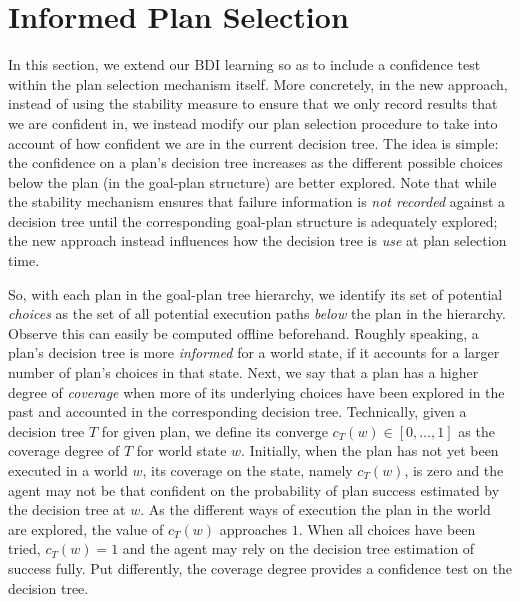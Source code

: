 \section{Informed Plan Selection}\label{sec:coverage}

In this section, we extend our BDI learning so as to include a confidence test
within the plan selection mechanism itself. More concretely, in the new approach,
instead of using the stability measure to ensure that we only record results that
we are confident in, we instead modify our plan selection procedure to take into
account of how confident we are in the current decision tree.
The idea is simple: the confidence on a plan's decision tree increases as the
different possible choices below the plan (in the goal-plan structure) are better
explored.
Note that while the stability mechanism ensures that failure information is
\emph{not recorded} against a decision tree until the corresponding goal-plan
structure is adequately explored; the new approach instead influences how the
decision tree is \emph{use} at plan selection time.


So, with each plan in the goal-plan tree hierarchy, we identify its set of
potential \textit{choices} as the set of all potential execution paths
\textit{below} the plan in the hierarchy. Observe this can easily be computed
offline beforehand.
Roughly speaking, a plan's decision tree is more \textit{informed} for a world
state, if it accounts for a larger number of plan's choices in that state.
Next, we say that a plan has a higher degree of \emph{coverage} when more of its
underlying choices have been explored in the past and accounted in the
corresponding decision tree.
Technically, given a decision tree $T$ for given plan, we define its converge
$c_T(w) \in [0,\ldots,1]$ as the coverage degree of $T$ for world state $w$.
Initially, when the plan has not yet been executed in a world $w$, its coverage
on the state, namely $c_T(w)$, is zero and the agent may not be that confident on
the probability of plan success estimated by the decision tree at $w$. As the
different ways of execution the plan in the world are explored, the value of
$c_T(w)$ approaches $1$. When all choices have been tried, $c_T(w)=1$ and the
agent may rely on the decision tree estimation of success fully.
Put differently, the coverage degree provides a confidence test on the decision
tree.




